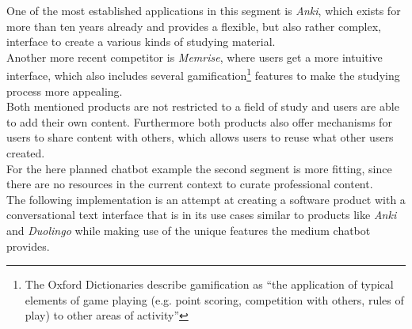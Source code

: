 One of the most established applications in this segment is \emph{Anki}\cite{lifehacker}, which exists for more than ten years already and provides a flexible, but also rather complex, interface to create a various kinds of studying material.
\\
Another more recent competitor is \emph{Memrise}, where users get a more intuitive interface, which also includes several gamification\footnote{The Oxford Dictionaries describe gamification as ``the application of typical elements of game playing (e.g. point scoring, competition with others, rules of play) to other areas of activity''\cite{oxfordgamification}} features to make the studying process more appealing.
\\

Both mentioned products are not restricted to a field of study and users are able to add their own content.
Furthermore both products also offer mechanisms for users to share content with others, which allows users to reuse what other users created.
\\

For the here planned chatbot example the second segment is more fitting, since there are no resources in the current context to curate professional content.
\\
The following implementation is an attempt at creating a software product with a conversational text interface that is in its use cases similar to products like \emph{Anki} and \emph{Duolingo} while making use of the unique features the medium chatbot provides.

